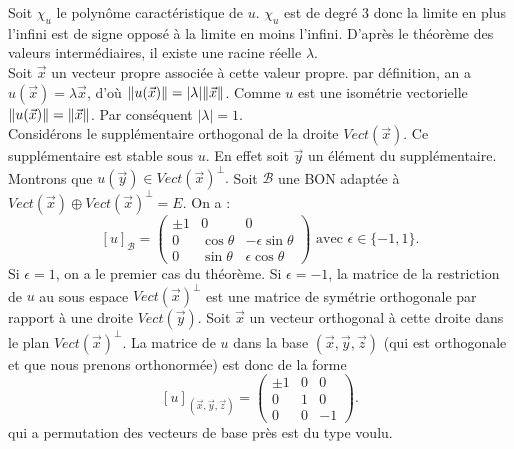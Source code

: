 \documentclass{book}
\begin{document}
\begin{Demonstration}
Soit $\chi_u$ le polynôme caractéristique de $u$. $\chi_u$ est de degré 3 donc la limite en plus l'infini est de signe opposé à la limite en moins l'infini. D'après  le théorème des valeurs intermédiaires, il existe une racine réelle $\lambda$.\\
Soit $\vec{x}$ un vecteur propre associée à cette valeur propre. par définition, an a  $u(\vec{x})=\lambda\vec{x}$, d'où  $\mathopen\lVert u(\vec{x}) \mathclose\rVert=|\lambda| \mathopen\lVert \vec{x} \mathclose\rVert$. Comme $u$ est une isométrie vectorielle  $\mathopen\lVert u(\vec{x}) \mathclose\rVert= \mathopen\lVert \vec{x} \mathclose\rVert$. Par conséquent $|\lambda|=1$.\\
Considérons le supplémentaire orthogonal de la droite $Vect(\vec{x})$. Ce supplémentaire
est stable sous $u $. En effet soit $\vec{y}$ un élément du supplémentaire. Montrons que $u(\vec{y})\in Vect(\vec{x})^{\perp}.$ 
Soit $\mathcal{B}$ une BON adaptée à $Vect(\vec{x})\oplus Vect(\vec{x})^{\perp}=E.$
On a :
$$[u]_{\mathcal{B}} = \begin{pmatrix}
\pm 1 & 0 &0\\
0 & \cos \theta &-\epsilon\sin \theta \\
0 & \sin \theta & \epsilon\cos \theta
\end{pmatrix}\text{ avec }\epsilon\in\{-1,1\}.$$
Si $\epsilon=1$, on a le premier cas du théorème. 
Si $\epsilon=-1$, la matrice de la restriction de $u$ au sous espace $Vect(\vec{x})^{\perp}$ est une matrice de symétrie orthogonale par rapport à une droite $Vect(\vec{y})$. Soit $\vec{x}$ un vecteur orthogonal à cette droite dans le plan $Vect(\vec{x})^{\perp}$. La matrice de $u$ dans la base $(\vec{x},\vec{y},\vec{z})$ (qui est orthogonale et que nous prenons orthonormée) est donc de la forme
$$[u]_{(\vec{x},\vec{y},\vec{z})} = \begin{pmatrix}
\pm 1 & 0 &0\\
0 & 1 &0 \\
0 & 0 & -1
\end{pmatrix}.$$
qui a permutation des vecteurs de base près est du type voulu.
\end{Demonstration}
\end{document}
